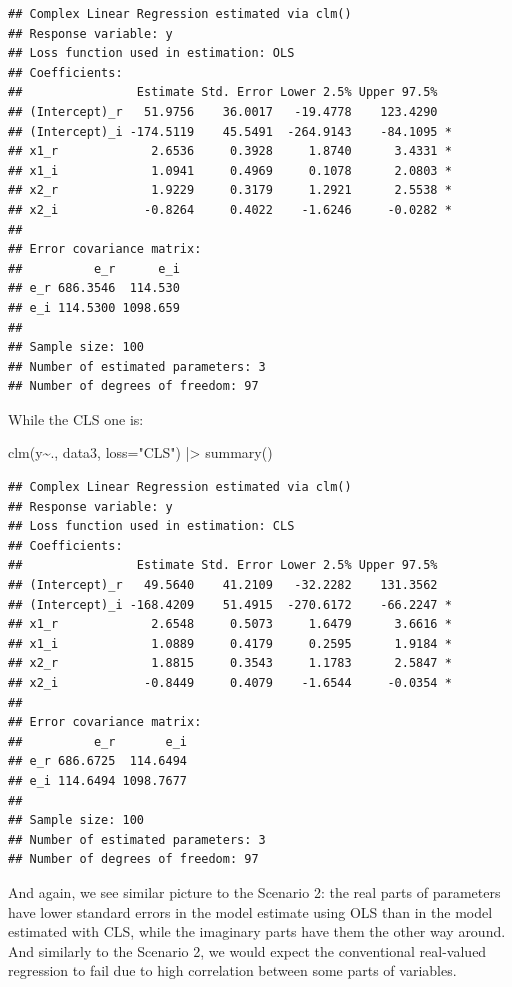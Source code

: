 \documentclass[
]{book}
\newenvironment{Shaded}{\begin{snugshade}}{\end{snugshade}}
\newcommand{\AttributeTok}[1]{\textcolor[rgb]{0.77,0.63,0.00}{#1}}
\newcommand{\FunctionTok}[1]{\textcolor[rgb]{0.00,0.00,0.00}{#1}}
\newcommand{\NormalTok}[1]{#1}
\newcommand{\SpecialCharTok}[1]{\textcolor[rgb]{0.00,0.00,0.00}{#1}}
\newcommand{\StringTok}[1]{\textcolor[rgb]{0.31,0.60,0.02}{#1}}
\begin{document}
\begin{verbatim}
## Complex Linear Regression estimated via clm()
## Response variable: y
## Loss function used in estimation: OLS
## Coefficients:
##                Estimate Std. Error Lower 2.5% Upper 97.5%  
## (Intercept)_r   51.9756    36.0017   -19.4778    123.4290  
## (Intercept)_i -174.5119    45.5491  -264.9143    -84.1095 *
## x1_r             2.6536     0.3928     1.8740      3.4331 *
## x1_i             1.0941     0.4969     0.1078      2.0803 *
## x2_r             1.9229     0.3179     1.2921      2.5538 *
## x2_i            -0.8264     0.4022    -1.6246     -0.0282 *
## 
## Error covariance matrix:
##          e_r      e_i
## e_r 686.3546  114.530
## e_i 114.5300 1098.659
## 
## Sample size: 100
## Number of estimated parameters: 3
## Number of degrees of freedom: 97
\end{verbatim}

While the CLS one is:

\begin{Shaded}
\begin{Highlighting}[]
\FunctionTok{clm}\NormalTok{(y}\SpecialCharTok{\textasciitilde{}}\NormalTok{., data3, }\AttributeTok{loss=}\StringTok{"CLS"}\NormalTok{) }\SpecialCharTok{|\textgreater{}}
    \FunctionTok{summary}\NormalTok{()}
\end{Highlighting}
\end{Shaded}

\begin{verbatim}
## Complex Linear Regression estimated via clm()
## Response variable: y
## Loss function used in estimation: CLS
## Coefficients:
##                Estimate Std. Error Lower 2.5% Upper 97.5%  
## (Intercept)_r   49.5640    41.2109   -32.2282    131.3562  
## (Intercept)_i -168.4209    51.4915  -270.6172    -66.2247 *
## x1_r             2.6548     0.5073     1.6479      3.6616 *
## x1_i             1.0889     0.4179     0.2595      1.9184 *
## x2_r             1.8815     0.3543     1.1783      2.5847 *
## x2_i            -0.8449     0.4079    -1.6544     -0.0354 *
## 
## Error covariance matrix:
##          e_r       e_i
## e_r 686.6725  114.6494
## e_i 114.6494 1098.7677
## 
## Sample size: 100
## Number of estimated parameters: 3
## Number of degrees of freedom: 97
\end{verbatim}

And again, we see similar picture to the Scenario 2: the real parts of parameters have lower standard errors in the model estimate using OLS than in the model estimated with CLS, while the imaginary parts have them the other way around. And similarly to the Scenario 2, we would expect the conventional real-valued regression to fail due to high correlation between some parts of variables.
\end{document}
